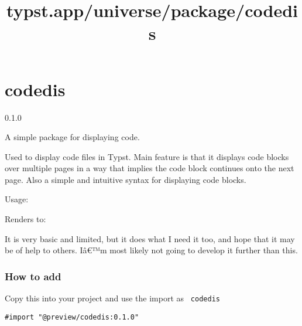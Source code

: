 \title{typst.app/universe/package/codedis}

\label{banner}
\section{codedis}\label{codedis}

{ 0.1.0 }

A simple package for displaying code.

\label{readme}
Used to display code files in Typst. Main feature is that it displays
code blocks over multiple pages in a way that implies the code block
continues onto the next page. Also a simple and intuitive syntax for
displaying code blocks.

Usage:

\begin{Shaded}
\begin{Highlighting}[]



\end{Highlighting}
\end{Shaded}

Renders to:

It is very basic and limited, but it does what I need it too, and hope
that it may be of help to others. Iâ€™m most likely not going to develop
it further than this.

\subsubsection{How to add}\label{how-to-add}

Copy this into your project and use the import as \texttt{\ codedis\ }

\begin{verbatim}
#import "@preview/codedis:0.1.0"
\end{verbatim}



